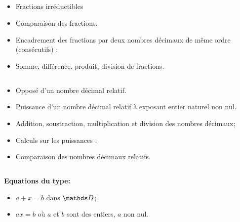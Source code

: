 \subsection*{}

\savoir
\begin{itemize}
\item Fractions irréductibles
\end{itemize}
\savoirfaire
\begin{itemize}
\item Comparaison des fractions.
\item Encadrement des fractions par deux nombres décimaux de même ordre (consécutifs) ;
\item Somme, différence, produit, division de fractions.
\end{itemize}

\subsection*{}

\savoir
\begin{itemize}
\item Opposé d'un nombre décimal relatif.
\item Puissance d'un nombre décimal relatif à exposant entier naturel non nul.
\end{itemize}
\savoirfaire
\begin{itemize}
\item Addition, soustraction, multiplication et division des nombres décimaux;
\item Calculs sur les puissances ;
\item Comparaison des nombres décimaux relatifs.
\end{itemize}

\subsection*{}

\savoir

\textbf{Equations du type:}
\begin{itemize}
\item  $a+x=b$ dans $\G D$;
\item $ax=b$ où $a$ et $b$ sont des entiers, $a$ non nul.
\end{itemize}